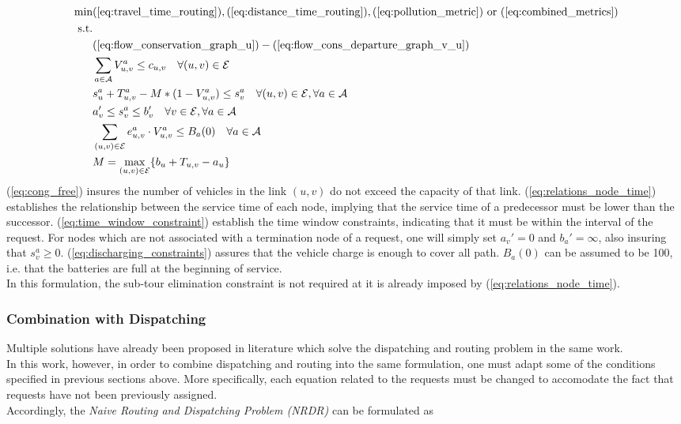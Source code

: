 \begin{align}
	\text{min}&  
		(\ref{eq:travel_time_routing}), (\ref{eq:distance_time_routing}), (\ref{eq:pollution_metric}) \text{ or } (\ref{eq:combined_metrics})
	\nonumber\\
	\text{s.t.} &\nonumber\\
	&(\ref{eq:flow_conservation_graph_u})-(\ref{eq:flow_cons_departure_graph_v_u})\nonumber\\
	&\sum_{a \in \mathcal{A}}V^a_{u,v} \leq c_{u,v} \quad \forall (u,v) \in \mathcal{E} \label{eq:cong_free}\\
	&s_{u}^a + T_{u,v}^a - M*(1-V^a_{u,v}) \leq s_{v}^a  \quad \forall (u,v) \in \mathcal{E}, \forall a \in \mathcal{A}\label{eq:relations_node_time}\\
	&a'_v \leq s_{v}^a \leq b'_v \quad \forall v \in \mathcal{E}, \forall a \in \mathcal{A}\label{eq:time_window_constraint}\\
	&\sum_{(u,v) \in \mathcal{E}}e^a_{u,v}\cdot V^a_{u,v} \leq B_a(0)\quad \forall a \in \mathcal{A} \label{eq:discharging_constraints}\\
	&M= \underset{(u,v) \in \mathcal{E}}{\text{max}}\{b_u + T_{u,v}-a_u\}\nonumber
\end{align} 
(\ref{eq:cong_free}) insures the number of vehicles in the link $(u,v)$ do not exceed the capacity of that link. (\ref{eq:relations_node_time}) establishes the relationship between the service time of each node, implying that the service time of a predecessor must be lower than the successor. (\ref{eq:time_window_constraint}) establish the time window constraints, indicating that it must be within the interval of the request. For nodes which are not associated with a termination node of a  request, one will simply set $a_v' = 0 $ and $b_a' = \infty$, also insuring that $s_v^a \ge 0 $. (\ref{eq:discharging_constraints}) assures that the vehicle charge is enough to cover all path. $B_a(0)$ can be assumed to be 100, i.e. that the batteries are full at the beginning of service. \\
In this formulation, the sub-tour elimination constraint is not required at it is already imposed by (\ref{eq:relations_node_time}). \\
\subsubsection*{Combination with Dispatching}
Multiple solutions have already been proposed in literature which solve the dispatching and routing problem in the same work. \\
In this work, however, in order to combine dispatching and routing into the same formulation, one must adapt some of the conditions specified in previous sections above. More specifically, each equation related to the requests must be changed to accomodate the fact that requests have not been previously assigned. \\
Accordingly, the \textit{Naive Routing and Dispatching Problem (NRDR)} can be formulated as 

